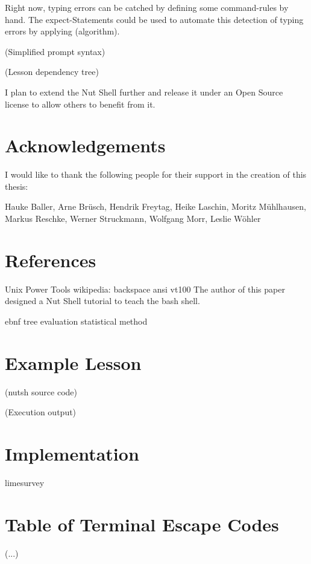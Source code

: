 \documentclass[twoside,parskip]{scrreprt}
\begin{document}
Right now, typing errors can be catched by defining some command-rules by hand. The expect-Statements could be used to automate this detection of typing errors by applying (algorithm).

    (Simplified prompt syntax)

    (Lesson dependency tree)

I plan to extend the Nut Shell further and release it under an Open Source license to allow others to benefit from it.

\chapter*{Acknowledgements}

I would like to thank the following people for their support in the creation of this thesis:

Hauke Baller,
Arne Brüsch,
Hendrik Freytag,
Heike Laschin,
Moritz Mühlhausen,
Markus Reschke,
Werner Struckmann,
Wolfgang Morr,
Leslie Wöhler

\chapter{References}

Unix Power Tools
wikipedia: backspace
ansi
vt100
The author of this paper designed a Nut Shell tutorial to teach the bash shell.

ebnf
tree evaluation
statistical method

\appendix

\chapter{Example Lesson}

(nutsh source code)

(Execution output)

\chapter{Implementation}

    limesurvey

\chapter{Table of Terminal Escape Codes}

(...)
\end{document}
